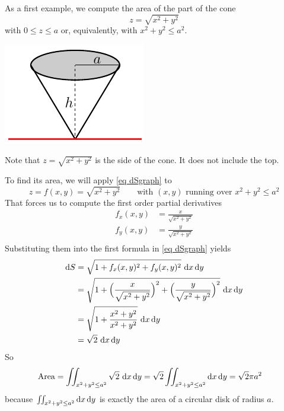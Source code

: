 \begin{eg}
       \label{eg area cone}
As a first example, we compute the area of the part of the
cone
\begin{equation*}
z=\sqrt{x^2+y^2}
\end{equation*}
with $0\le z\le a$ or, equivalently, with $x^2+y^2\le a^2$.
\begin{efig}
\begin{center}
    \includegraphics{cone}
\end{center}
\end{efig}
Note that $z=\sqrt{x^2+y^2}$ is the side of the cone. It does not include the top.


To find its area, we will apply \eqref{eq dSgraph} to
\begin{equation*}
z=f(x,y) = \sqrt{x^2+y^2} 
\qquad\text{with $(x,y)$ running over $x^2+y^2\le a^2$}
\end{equation*}
That forces us to compute the first order partial derivatives
\begin{align*}
f_x(x,y) & = \frac{x}{\sqrt{x^2+y^2}} \\
f_y(x,y) & = \frac{y}{\sqrt{x^2+y^2}} \\
\end{align*}
Substituting them into the first formula in \eqref{eq dSgraph} yields
\begin{align*}
\mathrm{d}S&= \sqrt{1 + f_x(x,y)^2 + f_y(x,y)^2}\  \mathrm{d}x\,\mathrm{d}y \\
   &=\sqrt{1+\Big(\frac{x}{\sqrt{x^2+y^2}}\Big)^2
            +\Big(\frac{y}{\sqrt{x^2+y^2}}\Big)^2} \ \mathrm{d}x\,\mathrm{d}y \\
   &=\sqrt{1+\frac{x^2+y^2}{x^2+y^2}} \ \mathrm{d}x\,\mathrm{d}y \\
   &=\sqrt{2} \ \mathrm{d}x\,\mathrm{d}y 
\end{align*}
So 
\begin{align*}
\text{Area} 
&= \iint_{x^2+y^2\le a^2} \sqrt{2}\ \mathrm{d}x\,\mathrm{d}y 
= \sqrt{2} \iint_{x^2+y^2\le a^2} \mathrm{d}x\,\mathrm{d}y 
= \sqrt{2} \pi a^2
\end{align*}
because $\iint_{x^2+y^2\le a^2} \mathrm{d}x\,\mathrm{d}y$ is exactly
the area of a circular disk of radius $a$.
\end{eg}

